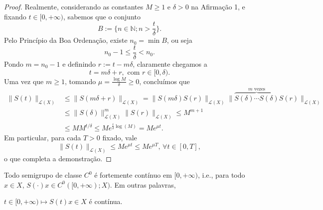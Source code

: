 \begin{proof}
Realmente, considerando as constantes $M\geq 1$ e $\delta >0$ na Afirmação 1, e fixando $t\in [0,+\infty)$, sabemos que o conjunto
\[
\displaystyle B:= \bigg\{ n\in \mathbb N; n>\frac{t}{\delta}\bigg\}.
\]
Pelo Princípio da Boa Ordenação, existe $n_0=\min B$, ou seja
\[
\displaystyle n_0 -1 \leq \frac{t}{\delta} <n_0.
\]
Pondo $m=n_0 -1$ e definindo $r:= t-m\delta$, claramente chegamos a
\[
\displaystyle t=m\delta +r, \text{ com } r\in [0,\delta).
\]
Uma vez que $m\geq 1$, tomando $\mu =\frac{\log M}{\delta} \geq 0$, concluímos que
\begin{align*}
 \|S(t)\|_{\mathcal{L}(X)} &
 \leq \|S(m\delta +r)\|_{\mathcal{L}(X)}= \|S(m\delta)S(r)\|_{\mathcal{L}(X)} \|\overbrace{S(\delta)\cdots S(\delta)}^{m \text{ vezes}}S(r)\|_{\mathcal{L}(X)}\\
& \leq 
\|S(\delta)\|^m_{\mathcal{L}(X)}\|S(r)\|_{\mathcal{L}(X)}\leq M^{m+1} \\
&\leq M M^{t/\delta} \leq Me^{\frac{t}{\delta}\log(M)}
=Me^{\mu t}. 
\end{align*}
Em particular, para cada $T>0$ fixado, vale
\[\|S(t)\|_{\mathcal{L}(X)}\leq Me^{\mu t}\leq Me^{\mu T},\, \forall t\in [0,T],\]
o que completa a demonstração.
\end{proof}


\begin{corollary}\label{Scontinua}
Todo semigrupo de classe $C^0$ é fortemente contínuo em $[0,+\infty)$, i.e., 
para todo $x\in X$, $S(\cdot)x\in C^0([0,+\infty);X)$. Em outras palavras,
\begin{center}
$t\in [0,+\infty)\longmapsto S(t)x\in  X$ é contínua.
\end{center}
\end{corollary}


